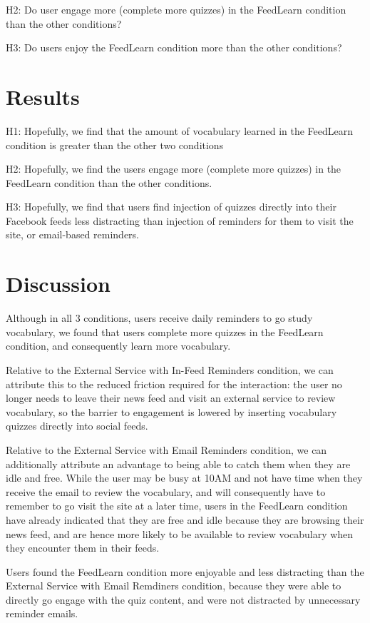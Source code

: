 \documentclass{chi-ext}
\begin{document}
H2: Do user engage more (complete more quizzes) in the FeedLearn condition than the other conditions?

H3: Do users enjoy the FeedLearn condition more than the other conditions?

\section{Results}

H1: Hopefully, we find that the amount of vocabulary learned in the FeedLearn condition is greater than the other two conditions

H2: Hopefully, we find the users engage more (complete more quizzes) in the FeedLearn condition than the other conditions.

H3: Hopefully, we find that users find injection of quizzes directly into their Facebook feeds less distracting than injection of reminders for them to visit the site, or email-based reminders.

\section{Discussion}

Although in all 3 conditions, users receive daily reminders to go study vocabulary, we found that users complete more quizzes in the FeedLearn condition, and consequently learn more vocabulary.

Relative to the External Service with In-Feed Reminders condition, we can attribute this to the reduced friction required for the interaction: the user no longer needs to leave their news feed and visit an external service to review vocabulary, so the barrier to engagement is lowered by inserting vocabulary quizzes directly into social feeds.

Relative to the External Service with Email Reminders condition, we can additionally attribute an advantage to being able to catch them when they are idle and free. While the user may be busy at 10AM and not have time when they receive the email to review the vocabulary, and will consequently have to remember to go visit the site at a later time, users in the FeedLearn condition have already indicated that they are free and idle because they are browsing their news feed, and are hence more likely to be available to review vocabulary when they encounter them in their feeds.

Users found the FeedLearn condition more enjoyable and less distracting than the External Service with Email Remdiners condition, because they were able to directly go engage with the quiz content, and were not distracted by unnecessary reminder emails.
\end{document}
